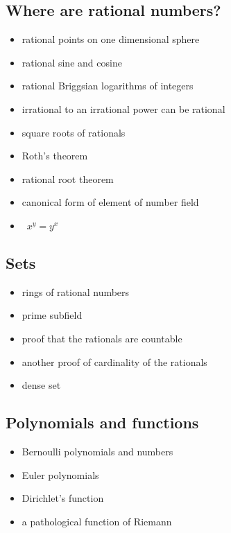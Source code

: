 \documentclass[12pt]{article}
\theoremstyle{definition}
\begin{document}
    \subsection*{Where are rational numbers?}
\begin{itemize}

\item rational points on one dimensional sphere

\item rational sine and cosine

\item rational Briggsian logarithms of integers

\item irrational to an irrational power can be rational

\item square roots of rationals

\item Roth's theorem

\item rational root theorem

\item canonical form of element of number field

\item {}\, $x^y = y^x$

\end{itemize}


    \subsection*{Sets}
\begin{itemize}

\item rings of rational numbers

\item prime subfield

\item proof that the rationals are countable

\item another proof of cardinality of the rationals

\item dense set

\end{itemize}


    \subsection*{Polynomials and functions}
\begin{itemize}

\item Bernoulli polynomials and numbers

\item Euler polynomials

\item Dirichlet's function

\item a pathological function of Riemann

\end{itemize}
\end{document}
